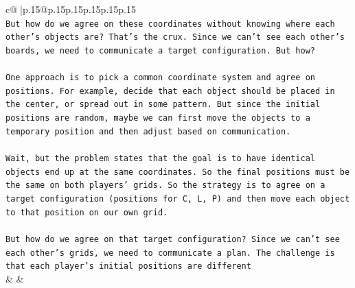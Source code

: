 \documentclass{article}
\begin{document}
{\begin{supertabular}{c@{$\;$}|p{.15\linewidth}@{}p{.15\linewidth}p{.15\linewidth}p{.15\linewidth}p{.15\linewidth}p{.15\linewidth}}
{{{\\ 
\texttt{But how do we agree on these coordinates without knowing where each other's objects are? That's the crux. Since we can't see each other's boards, we need to communicate a target configuration. But how?} \\
\\ 
\texttt{One approach is to pick a common coordinate system and agree on positions. For example, decide that each object should be placed in the center, or spread out in some pattern. But since the initial positions are random, maybe we can first move the objects to a temporary position and then adjust based on communication.} \\
\\ 
\texttt{Wait, but the problem states that the goal is to have identical objects end up at the same coordinates. So the final positions must be the same on both players' grids. So the strategy is to agree on a target configuration (positions for C, L, P) and then move each object to that position on our own grid.} \\
\\ 
\texttt{But how do we agree on that target configuration? Since we can't see each other's grids, we need to communicate a plan. The challenge is that each player's initial positions are different} \\
            }
        }
    }
    & & \\ \\


\end{supertabular}}
\end{document}
